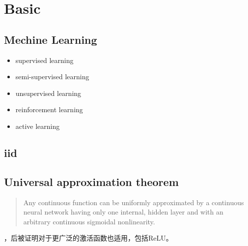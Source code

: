\chapter{Basic}

\section{Mechine Learning}
\begin{itemize}
    \item supervised learning
    \item semi-supervised learning
    \item unsupervised learning
    \item reinforcement learning
    \item active learning
\end{itemize}

\section{iid}

\section{Universal approximation theorem}
\begin{quotation}
    Any continuous function can be uniformly approximated by a continuous neural network having only one
    internal, hidden layer and with an arbitrary continuous sigmoidal nonlinearity.\cite{Cybenko1989}
\end{quotation}
，后被证明对于更广泛的激活函数也适用\cite{Leshno1993}，包括ReLU。

